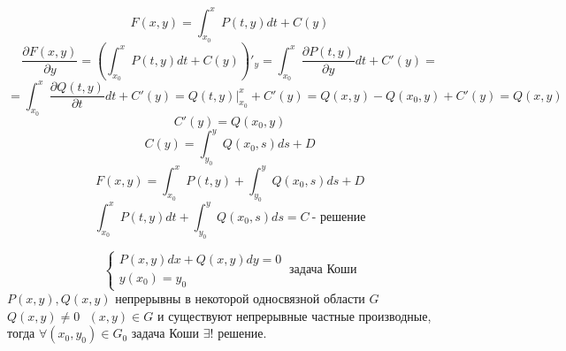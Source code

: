 \begin{block}
  $$
  F(x, y) = \int_{x_0}^x P(t, y)dt + C(y)
  $$
  $$
  \frac{\partial F(x, y)}{\partial y} =
  \left( \int_{x_0}^x P(t, y)dt + C(y) \right)'_y =
  \int_{x_0}^x \frac{\partial P(t, y)}{\partial y} dt + C'(y) =
  $$
  $$
  = \int_{x_0}^x \frac{\partial Q(t, y)}{\partial t} dt + C'(y) =
  Q(t, y)|_{x_0}^x + C'(y) = Q(x, y) - Q(x_0, y) + C'(y) = Q(x, y)
  $$
  $$
  C'(y) = Q(x_0, y)
  $$
  $$
  C(y) = \int_{y_0}^y Q(x_0, s) ds + D
  $$
  $$
  F(x, y) = \int_{x_0}^x P(t, y) + \int_{y_0}^y Q(x_0, s) ds + D
  $$
  $$
  \int_{x_0}^x P(t, y)dt + \int_{y_0}^y Q(x_0, s) ds = C ~ \text{- решение}
  $$
\end{block}

\begin{theorem}
  $$
  \left\{
  \begin{array}{l}
    P(x,y)dx + Q(x,y)dy = 0 \\
    y(x_0) = y_0
  \end{array}
  \right. ~ \text{задача Коши}
  $$
  $P(x, y), Q(x, y)$ непрерывны в некоторой односвязной области $G$
  $Q(x, y) \not= 0 ~~~ (x,y) \in G$ и существуют непрерывные частные
  производные, тогда $\forall (x_0, y_0) \in G_0$ задача Коши
  $\exists !$ решение.
\end{theorem}

